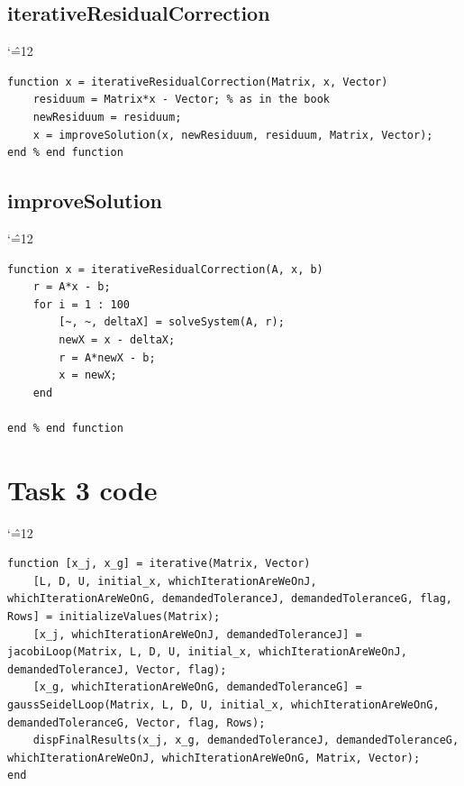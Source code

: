 \documentclass[12pt]{report}
\newenvironment{simplechar}{%
   \catcode`\^=12
}{}
\begin{document}
\subsection{iterativeResidualCorrection}
\begin{simplechar}
\begin{lstlisting}
function x = iterativeResidualCorrection(Matrix, x, Vector)
    residuum = Matrix*x - Vector; % as in the book
    newResiduum = residuum;
    x = improveSolution(x, newResiduum, residuum, Matrix, Vector);
end % end function
\end{lstlisting}
\end{simplechar}

\subsection{improveSolution}
\begin{simplechar}
\begin{lstlisting}
function x = iterativeResidualCorrection(A, x, b)
    r = A*x - b;
    for i = 1 : 100
        [~, ~, deltaX] = solveSystem(A, r);
        newX = x - deltaX;
        r = A*newX - b;
        x = newX;
    end

end % end function

\end{lstlisting}
\end{simplechar}

\section{Task 3 code}
\begin{simplechar}
\begin{lstlisting}
function [x_j, x_g] = iterative(Matrix, Vector)
    [L, D, U, initial_x, whichIterationAreWeOnJ, whichIterationAreWeOnG, demandedToleranceJ, demandedToleranceG, flag, Rows] = initializeValues(Matrix);
    [x_j, whichIterationAreWeOnJ, demandedToleranceJ] = jacobiLoop(Matrix, L, D, U, initial_x, whichIterationAreWeOnJ, demandedToleranceJ, Vector, flag);
    [x_g, whichIterationAreWeOnG, demandedToleranceG] = gaussSeidelLoop(Matrix, L, D, U, initial_x, whichIterationAreWeOnG, demandedToleranceG, Vector, flag, Rows);
    dispFinalResults(x_j, x_g, demandedToleranceJ, demandedToleranceG, whichIterationAreWeOnJ, whichIterationAreWeOnG, Matrix, Vector);
end

\end{lstlisting}
\end{simplechar}
\end{document}
